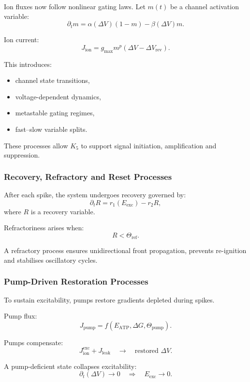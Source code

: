 Ion fluxes now follow nonlinear gating laws.
Let $m(t)$ be a channel activation variable:
\[
\partial_t m = \alpha(\Delta V)(1-m) - \beta(\Delta V)m.
\]

Ion current:
\[
J_{\text{ion}} = g_{\text{max}} m^p (\Delta V - \Delta V_{\text{rev}}).
\]

This introduces:
\begin{itemize}
    \item channel state transitions,
    \item voltage-dependent dynamics,
    \item metastable gating regimes,
    \item fast–slow variable splits.
\end{itemize}

These processes allow $K_5$ to support signal initiation,
amplification and suppression.

\subsubsection{Recovery, Refractory and Reset Processes}

After each spike, the system undergoes recovery governed by:
\[
\partial_t R = r_1(E_{\text{exc}}) - r_2 R,
\]
where $R$ is a recovery variable.

Refractoriness arises when:
\[
R < \Theta_{\text{ref}}.
\]

A refractory process ensures unidirectional front propagation,
prevents re-ignition and stabilises oscillatory cycles.

\subsubsection{Pump-Driven Restoration Processes}

To sustain excitability, pumps restore gradients depleted during spikes.

Pump flux:
\[
J_{\text{pump}} = f(E_{\text{ATP}}, \Delta G, \Theta_{\text{pump}}).
\]

Pumps compensate:
\[
J_{\text{ion}}^{\text{exc}} + J_{\text{leak}}
\quad\longrightarrow\quad
\text{restored }\Delta V.
\]

A pump-deficient state collapses excitability:
\[
\partial_t (\Delta V) \to 0
\quad\Rightarrow\quad
E_{\text{exc}} \to 0.
\]

